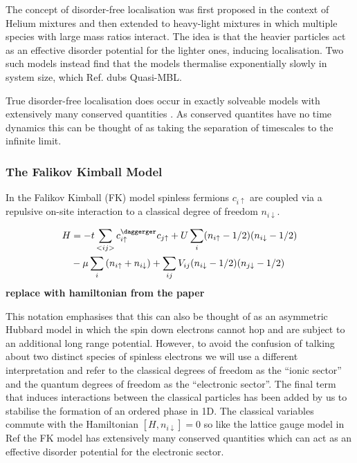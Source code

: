 The concept of disorder-free localisation was first proposed in the context of Helium mixtures \autocite{kagan1984localization} and then extended to heavy-light mixtures in which multiple species with large mass ratios interact. The idea is that the heavier particles act as an effective disorder potential for the lighter ones, inducing localisation. Two such models \autocite{yaoQuasiManyBodyLocalizationTranslationInvariant2016,schiulazDynamicsManybodyLocalized2015} instead find that the models thermalise exponentially slowly in system size, which Ref. \autocite{yaoQuasiManyBodyLocalizationTranslationInvariant2016} dubs Quasi-MBL.

True disorder-free localisation does occur in exactly solveable models with extensively many conserved quantities \autocite{smithDisorderFreeLocalization2017}. As conserved quantites have no time dynamics this can be thought of as taking the separation of timescales to the infinite limit.

\hypertarget{the-falikov-kimball-model}{%
\subsubsection{The Falikov Kimball Model}\label{the-falikov-kimball-model}}

In the Falikov Kimball (FK) model spinless fermions \(c_{i\uparrow}\) are coupled via a repulsive on-site interaction to a classical degree of freedom \(n_{i\downarrow}\).

\[\begin{aligned}
H &= -t \sum_{<ij>} c^\daggerger_{i\uparrow}c_{j\uparrow} + U \sum_{i} (n_{i \uparrow} - 1/2)( n_{i\downarrow} - 1/2) \\
       & - \mu \sum_i \left( n_{i \uparrow} + n_{i \downarrow} \right) + \sum_{ij} V_{ij} (n_{i\downarrow} - 1/2)(n_{j\downarrow} - 1/2) 
\end{aligned}\] \textbf{replace with hamiltonian from the paper}

This notation emphasises that this can also be thought of as an asymmetric Hubbard model in which the spin down electrons cannot hop and are subject to an additional long range potential. However, to avoid the confusion of talking about two distinct species of spinless electrons we will use a different interpretation and refer to the classical degrees of freedom as the ``ionic sector'' and the quantum degrees of freedom as the ``electronic sector''. The final term that induces interactions between the classical particles has been added by us to stabilise the formation of an ordered phase in 1D. The classical variables commute with the Hamiltonian \([H, n_{i\downarrow}] = 0\) so like the lattice gauge model in Ref \autocite{smithDisorderFreeLocalization2017} the FK model has extensively many conserved quantities which can act as an effective disorder potential for the electronic sector.


